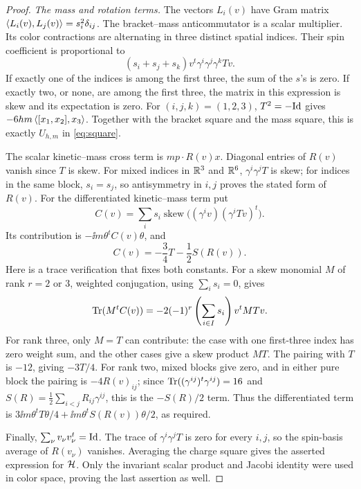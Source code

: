 \begin{proof}
\smallskip\noindent\emph{The mass and rotation terms.}
The vectors \(L_i(v)\) have Gram matrix
\(\left\langle L_i(v),L_j(v)\right\rangle=s_i^2\delta_{ij}\). The bracket--mass
anticommutator is a scalar multiplier. Its color contractions are
alternating in three distinct spatial indices. Their spin coefficient
is proportional to
\[
 (s_i+s_j+s_k)v^t\gamma^i\gamma^j\gamma^kTv.
\]
If exactly one of the indices is among the first three, the sum of
the \(s\)'s is zero. If exactly two, or none, are among the first
three, the matrix in this expression is skew and its expectation is
zero. For \((i,j,k)=(1,2,3)\), \(T^2=-\mathrm{Id}\) gives
\(-6hm\left\langle [x_1,x_2],x_3\right\rangle\). Together with the bracket square and
the mass square, this is exactly \(U_{h,m}\) in
\eqref{eq:square}.

The scalar kinetic--mass cross term is \(mp\cdot R(v)x\). Diagonal
entries of \(R(v)\) vanish since \(T\) is skew. For mixed indices
in \(\mathbb R^3\) and \(\mathbb R^6\), \(\gamma^i\gamma^jT\) is skew; for
indices in the same block, \(s_i=s_j\), so antisymmetry in \(i,j\)
proves the stated form of \(R(v)\).
For the differentiated kinetic--mass term put
\[
 C(v)=\sum_i s_i\operatorname{skew}
               \bigl((\gamma^iv)(\gamma^iTv)^t\bigr).
\]
Its contribution is \(-\ii m\theta^tC(v)\theta\), and
\begin{equation}
\label{alg:mass-spin-identity}
 C(v)=-\frac34T-\frac12S(R(v)).
\end{equation}
Here is a trace verification that fixes both constants. For a skew
monomial \(M\) of rank \(r=2\) or \(3\), weighted conjugation,
using \(\sum_i s_i=0\), gives
\[
 \operatorname{Tr}(M^tC(v))
 =-2(-1)^r\left(\sum_{i\in I}s_i\right)v^tMTv.
\]
For rank three, only \(M=T\) can contribute: the case with one
first-three index has zero weight sum, and the other cases give a
skew product \(MT\). The pairing with \(T\) is \(-12\), giving
\(-3T/4\). For rank two, mixed blocks give zero, and in either pure
block the pairing is \(-4R(v)_{ij}\); since
\(\operatorname{Tr}((\gamma^{ij})^t\gamma^{ij})=16\) and
\(S(R)=\frac12\sum_{i<j}R_{ij}\gamma^{ij}\), this is the
\(-S(R)/2\) term. Thus the differentiated term is
\(3\ii m\theta^tT\theta/4+\ii m\theta^tS(R(v))\theta/2\), as
required.

Finally, \(\sum_\nu v_\nu v_\nu^t=\mathrm{Id}\). The trace of
\(\gamma^i\gamma^jT\) is zero for every \(i,j\), so the spin-basis
average of \(R(v_\nu)\) vanishes. Averaging the charge square gives
the asserted expression for \(\mathcal H\). Only the invariant scalar
product and Jacobi identity were used in color space, proving the
last assertion as well.
\end{proof}

